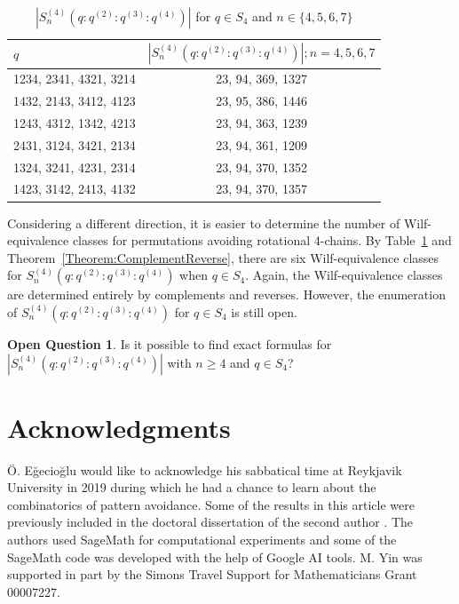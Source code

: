\documentclass[11pt]{article}
\theoremstyle{definition}
\newtheorem{question}[theorem]{Open Question}
\numberwithin{equation}{section}
\begin{document}
\begin{table}[H]
\renewcommand{\arraystretch}{1.5}
\centering
\begin{tabular}{|l||c|}
\hline
$q$ &$|S^{(4)}_n(q:q^{(2)}:q^{(3)}:q^{(4)})|; n=4, 5, 6, 7$\\\hline\hline
1234, 2341, 4321, 3214&23, 94, 369, 1327\\\hline
1432, 2143, 3412, 4123&23, 95, 386, 1446\\\hline
1243, 4312, 1342, 4213&23, 94, 363, 1239\\\hline
2431, 3124, 3421, 2134&23, 94, 361, 1209\\\hline
1324, 3241, 4231, 2314&23, 94, 370, 1352\\\hline
1423, 3142, 2413, 4132&23, 94, 370, 1357\\\hline

\end{tabular}
\caption{$|S^{(4)}_n(q:q^{(2)}:q^{(3)}:q^{(4)})|$ for $q\in S_4$ and $n\in\{4,5,6,7\}$}\label{Table2}
\end{table}

Considering a different direction, it is easier to determine the number of Wilf-equivalence classes for permutations avoiding rotational 4-chains. By Table~\ref{Table2} and Theorem~\ref{Theorem:ComplementReverse}, there are six Wilf-equivalence classes for $S^{(4)}_n(q:q^{(2)}:q^{(3)}:q^{(4)})$ when $q\in S_4$. Again, the Wilf-equivalence classes are determined entirely by complements and reverses. 
However, the enumeration of $S^{(4)}_n(q:q^{(2)}:q^{(3)}:q^{(4)})$ for $q\in S_4$ is still open.

\begin{question}
Is it possible to find exact formulas for $|S^{(4)}_n(q:q^{(2)}:q^{(3)}:q^{(4)})|$ with $n\geq4$ and $q\in S_4$?
\end{question}

\section*{Acknowledgments}
\"{O}. E\u{g}ecio\u{g}lu would like to acknowledge his sabbatical time at Reykjavik University in
2019 during which he had a chance to learn about the combinatorics of
pattern avoidance. Some of the results in this article were previously included in the doctoral dissertation of the second author \cite{Gaiser2024b}. 
The authors used SageMath for computational experiments and some of the SageMath code was developed with the help of Google AI tools. 
M. Yin was supported in part by the Simons Travel Support for Mathematicians Grant 00007227.
\end{document}

